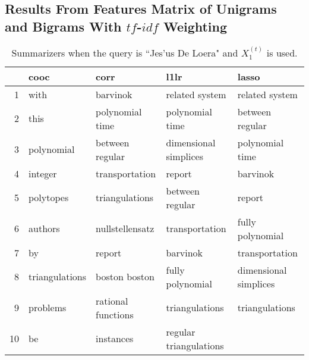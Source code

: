 \documentclass{article}
\begin{document}
\subsection{Results From Features Matrix of Unigrams and Bigrams With $tf$-$idf$ Weighting}
\begin{table}[H]
\begin{center}
\begin{tabular}{|r|llll|}
\hline
& cooc & corr & l1lr & lasso \\
\hline
1 & with & barvinok & related system & related system \\
2 & this & polynomial time & polynomial time & between regular \\
3 & polynomial & between regular & dimensional simplices & polynomial time \\
4 & integer & transportation & report & barvinok \\
5 & polytopes & triangulations & between regular & report \\
6 & authors & nullstellensatz & transportation & fully polynomial \\
7 & by & report & barvinok & transportation \\
8 & triangulations & boston boston & fully polynomial & dimensional simplices \\
9 & problems & rational functions & triangulations & triangulations \\
10 & be & instances & regular triangulations & \\
\hline
\end{tabular}
\end{center}
\caption{Summarizers when the query is ``Jes\a'us De Loera" and $X_1^{(t)}$ is used.}
\end{table}
\end{document}
